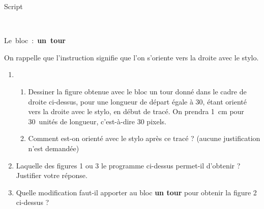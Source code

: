 \begin{minipage}{.4\linewidth}
Script
\begin{scratch}
    {
    }
\end{scratch}
\end{minipage}
\begin{minipage}{.2\linewidth}
~
\end{minipage}
\begin{minipage}{.4\linewidth}
{Le~bloc~:~\textbf{un~tour}}

\begin{scratch}
		{
		}		
		{
		}
\end{scratch}
\end{minipage}

\medskip

On rappelle que l'instruction  signifie que l'on s'oriente vers la droite avec le stylo.

\medskip

\begin{enumerate}
\item 
	\begin{enumerate}
		\item Dessiner la figure obtenue avec le bloc \og un tour\fg{} donné dans le cadre de droite ci-dessus, pour une longueur de départ égale à 30, étant orienté vers la droite avec le stylo, en début de tracé. On prendra 1~cm pour 30~unités de longueur, c'est-à-dire 30 pixels.
		\item Comment est-on orienté avec le stylo après ce tracé ? (aucune justification n'est demandée)
	\end{enumerate}
\item Laquelle des figures 1 ou 3 le programme ci-dessus permet-il d'obtenir ? Justifier votre réponse.
\item Quelle modification faut-il apporter au bloc \og \textbf{un tour}\fg{} pour obtenir la figure 2 ci-dessus ?
\end{enumerate}

\vspace{0,5cm}

